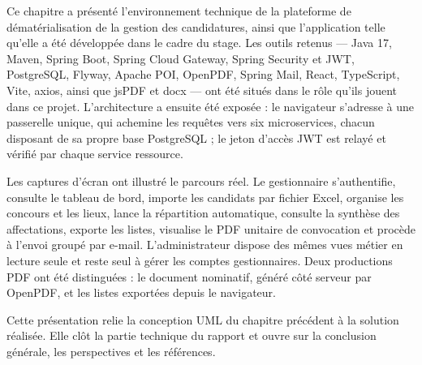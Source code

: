 \begin{onehalfspace}
Ce chapitre a présenté l'environnement technique de la plateforme de dématérialisation de la gestion des candidatures, ainsi que l'application telle qu'elle a été développée dans le cadre du stage. Les outils retenus --- Java 17, Maven, Spring Boot, Spring Cloud Gateway, Spring Security et JWT, PostgreSQL, Flyway, Apache POI, OpenPDF, Spring Mail, React, TypeScript, Vite, axios, ainsi que jsPDF et docx --- ont été situés dans le rôle qu'ils jouent dans ce projet. L'architecture a ensuite été exposée : le navigateur s'adresse à une passerelle unique, qui achemine les requêtes vers six microservices, chacun disposant de sa propre base PostgreSQL ; le jeton d'accès JWT est relayé et vérifié par chaque service ressource.

Les captures d'écran ont illustré le parcours réel. Le gestionnaire s'authentifie, consulte le tableau de bord, importe les candidats par fichier Excel, organise les concours et les lieux, lance la répartition automatique, consulte la synthèse des affectations, exporte les listes, visualise le PDF unitaire de convocation et procède à l'envoi groupé par e-mail. L'administrateur dispose des mêmes vues métier en lecture seule et reste seul à gérer les comptes gestionnaires. Deux productions PDF ont été distinguées : le document nominatif, généré côté serveur par OpenPDF, et les listes exportées depuis le navigateur.

Cette présentation relie la conception UML du chapitre précédent à la solution réalisée. Elle clôt la partie technique du rapport et ouvre sur la conclusion générale, les perspectives et les références.

\end{onehalfspace}

